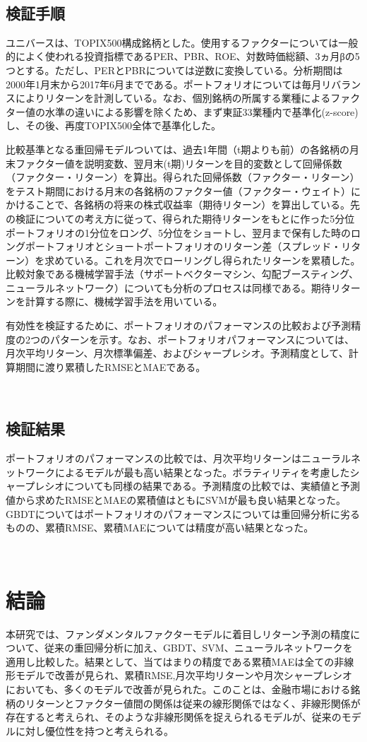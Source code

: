 \ 
\subsection{検証手順}
ユニバースは、TOPIX500構成銘柄とした。使用するファクターについては一般的によく使われる投資指標であるPER、PBR、ROE、対数時価総額、3ヵ月βの5つとする。ただし、PERとPBRについては逆数に変換している。分析期間は2000年1月末から2017年6月までである。ポートフォリオについては毎月リバランスによりリターンを計測している。なお、個別銘柄の所属する業種によるファクター値の水準の違いによる影響を除くため、まず東証33業種内で基準化(z-score)し、その後、再度TOPIX500全体で基準化した。

比較基準となる重回帰モデルついては、過去1年間（t期よりも前）の各銘柄の月末ファクター値を説明変数、翌月末(t期)リターンを目的変数として回帰係数（ファクター・リターン）を算出。得られた回帰係数（ファクター・リターン）をテスト期間における月末の各銘柄のファクター値（ファクター・ウェイト）にかけることで、各銘柄の将来の株式収益率（期待リターン）を算出している。先の検証についての考え方に従って、得られた期待リターンをもとに作った5分位ポートフォリオの1分位をロング、5分位をショートし、翌月まで保有した時のロングポートフォリオとショートポートフォリオのリターン差（スプレッド・リターン）を求めている。これを月次でローリングし得られたリターンを累積した。
比較対象である機械学習手法（サポートベクターマシン、勾配ブースティング、ニューラルネットワーク）についても分析のプロセスは同様である。期待リターンを計算する際に、機械学習手法を用いている。

有効性を検証するために、ポートフォリオのパフォーマンスの比較および予測精度の2つのパターンを示す。なお、ポートフォリオパフォーマンスについては、月次平均リターン、月次標準偏差、およびシャープレシオ。予測精度として、計算期間に渡り累積したRMSEとMAEである。

\ 
\subsection{検証結果}


ポートフォリオのパフォーマンスの比較では、月次平均リターンはニューラルネットワークによるモデルが最も高い結果となった。ボラティリティを考慮したシャープレシオについても同様の結果である。予測精度の比較では、実績値と予測値から求めたRMSEとMAEの累積値はともにSVMが最も良い結果となった。GBDTについてはポートフォリオのパフォーマンスについては重回帰分析に劣るものの、累積RMSE、累積MAEについては精度が高い結果となった。

\ 
\section{結論} %
本研究では、ファンダメンタルファクターモデルに着目しリターン予測の精度について、従来の重回帰分析に加え、GBDT、SVM、ニューラルネットワークを適用し比較した。結果として、当てはまりの精度である累積MAEは全ての非線形モデルで改善が見られ、累積RMSE,月次平均リターンや月次シャープレシオにおいても、多くのモデルで改善が見られた。このことは、金融市場における銘柄のリターンとファクター値間の関係は従来の線形関係ではなく、非線形関係が存在すると考えられ、そのような非線形関係を捉えられるモデルが、従来のモデルに対し優位性を持つと考えられる。

